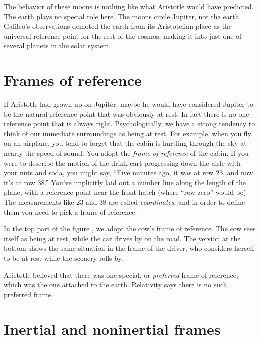 The behavior of these moons is nothing like what Aristotle would have predicted. The earth
plays no special role here. The moons circle Jupiter, not the earth. Galileo's observations demoted
the earth from its Aristotelian place as the universal reference point for the rest of the cosmos,
making it into just one of several planets in the solar system.




\vfill\pagebreak

\section{Frames of reference}\label{sec:frames-of-reference}

If Aristotle had grown up on Jupiter, maybe he would have considered Jupiter to be the natural reference
point that was obviously at rest. In fact there is no one reference point that is always right. Psychologically,
we have a strong tendency to think of our immediate surroundings as being at rest. For example, when you fly
on an airplane, you tend to forget that the cabin is hurtling through the sky at nearly the speed of sound.
You adopt the \emph{frame of reference} of the cabin.
If you were to describe the motion of the drink cart progressing down the aisle with your nuts and soda,
you might say, ``Five minutes ago, it was at row 23, and now it's at row 38.'' You've implicitly laid out
a number line along the length of the plane, with a reference point near the front hatch (where ``row zero'' would be).
The measurements like 23 and 38 are called \emph{coordinates}, and in order to define them you need to pick
a frame of reference.




In the top part of the figure , we adopt the cow's frame of reference. The cow sees itself as being at rest,
while the car drives by on the road. The version at the bottom shows the same situation in
the frame of the driver,
who considers herself to be at rest while the scenery rolls by.

Aristotle believed that there was one special, or \emph{preferred} frame of reference, which was
the one attached to the earth. Relativity says there is no such
preferred frame.

\section{Inertial and noninertial frames}


